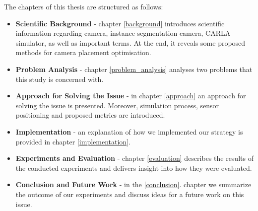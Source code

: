 The chapters of this thesis are structured as follows: 
\begin{itemize}
    \item \textbf{Scientific Background} - chapter \ref{background} introduces scientific information regarding camera, instance segmentation camera, CARLA simulator, as well as important terms. At the end, it reveals some proposed methods for camera placement optimisation.
    \item \textbf{Problem Analysis} - chapter \ref{problem_analysis} analyses two problems that this study is concerned with.
    \item \textbf{Approach for Solving the Issue} - in chapter \ref{approach} an approach for solving the issue is presented. Moreover, simulation process, sensor positioning and proposed metrics are introduced.
    \item  \textbf{Implementation} - an explanation of how we implemented our strategy is provided in chapter \ref{implementation}.
    \item \textbf{Experiments and Evaluation} - chapter \ref{evaluation} describes the results of the conducted experiments and delivers insight into how they were evaluated.
    \item \textbf{Conclusion and Future Work} - in the \ref{conclusion}. chapter we summarize the outcome of our experiments and discuss ideas for a future work on this issue.
\end{itemize} 
